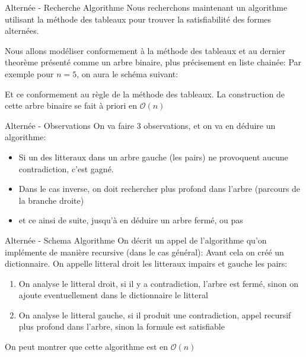 \documentclass[]{beamer}
\begin{document}
\begin{frame}{Alternée - Recherche Algorithme}
    Nous recherchons maintenant un algorithme utilisant la méthode des tableaux pour trouver la satisfiabilité des formes alternées.

    Nous allons modéliser conformement à la méthode des tableaux et au dernier theorème présenté comme un arbre binaire, plus précisement en liste chainée:
    Par exemple pour $n=5$, on aura le schéma suivant:
    
    \pause
    
    \pause
    Et ce conformement au règle de la méthode des tableaux.
    La construction de cette arbre binaire se fait à priori en $\mathcal{O}(n)$
\end{frame}

\begin{frame}{Alternée - Observations}
    On va faire 3 observations, et on va en déduire un algorithme:
    \begin{itemize}
        \item Si un des litteraux dans un arbre gauche (les pairs) ne provoquent aucune contradiction, c'est gagné.
        \item Dans le cas inverse, on doit rechercher plus profond dans l'arbre (parcours de la branche droite)
        \item et ce ainsi de suite, jusqu'à en déduire un arbre fermé, ou pas
    \end{itemize}

\end{frame}

\begin{frame}{Alternée - Schema Algorithme}
    On décrit un appel de l'algorithme qu'on implémente de manière recursive (dans le cas général):
    Avant cela on créé un dictionnaire. 
    On appelle litteral droit les litteraux impairs et gauche les pairs:  
    \begin{enumerate}
        \item On analyse le litteral droit, si il y a contradiction, l'arbre est fermé, sinon on ajoute eventuellement dans le dictionnaire le litteral
        \item On analyse le litteral gauche, si il produit une contradiction, appel recursif plus profond dans l'arbre, sinon la formule est satisfiable
    \end{enumerate}
    On peut montrer que cette algorithme est en $\mathcal{O}(n)$
\end{frame}
\end{document}
